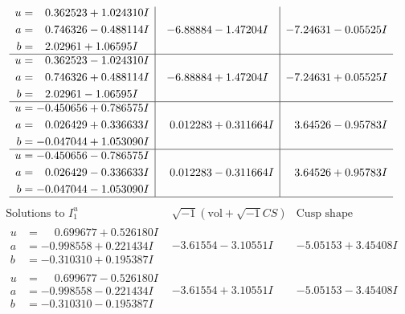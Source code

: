 \documentclass[1p]{elsarticle_modified}
\theoremstyle{definition}
\newcommand{\I}{\sqrt{-1}}
\begin{document}
$$\begin{array}{c|c|c}
\begin{aligned}
u &= \phantom{-}0.362523 + 1.024310 I \\
a &= \phantom{-}0.746326 - 0.488114 I \\
b &= \phantom{-}2.02961 + 1.06595 I\end{aligned}
 & -6.88884 - 1.47204 I & -7.24631 - 0.05525 I \\ \hline\begin{aligned}
u &= \phantom{-}0.362523 - 1.024310 I \\
a &= \phantom{-}0.746326 + 0.488114 I \\
b &= \phantom{-}2.02961 - 1.06595 I\end{aligned}
 & -6.88884 + 1.47204 I & -7.24631 + 0.05525 I \\ \hline\begin{aligned}
u &= -0.450656 + 0.786575 I \\
a &= \phantom{-}0.026429 + 0.336633 I \\
b &= -0.047044 + 1.053090 I\end{aligned}
 & \phantom{-}0.012283 + 0.311664 I & \phantom{-}3.64526 - 0.95783 I \\ \hline\begin{aligned}
u &= -0.450656 - 0.786575 I \\
a &= \phantom{-}0.026429 - 0.336633 I \\
b &= -0.047044 - 1.053090 I\end{aligned}
 & \phantom{-}0.012283 - 0.311664 I & \phantom{-}3.64526 + 0.95783 I\\
 \hline 
 \end{array}$$\newpage$$\begin{array}{c|c|c}  
\text{Solutions to }I^u_{1}& \I (\text{vol} + \sqrt{-1}CS) & \text{Cusp shape}\\
 \hline 
\begin{aligned}
u &= \phantom{-}0.699677 + 0.526180 I \\
a &= -0.998558 + 0.221434 I \\
b &= -0.310310 + 0.195387 I\end{aligned}
 & -3.61554 - 3.10551 I & -5.05153 + 3.45408 I \\ \hline\begin{aligned}
u &= \phantom{-}0.699677 - 0.526180 I \\
a &= -0.998558 - 0.221434 I \\
b &= -0.310310 - 0.195387 I\end{aligned}
 & -3.61554 + 3.10551 I & -5.05153 - 3.45408 I \\ \hline\begin{aligned}

\end{aligned}
\end{array}$$
\end{document}
